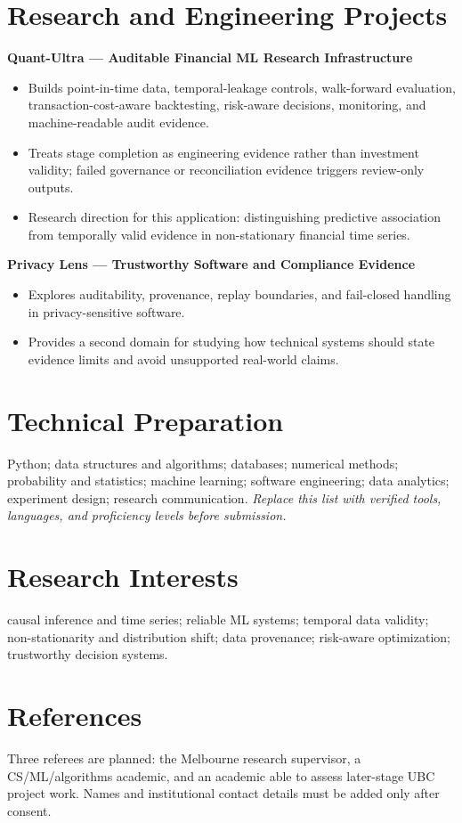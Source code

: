 \documentclass[11pt]{article}
\begin{document}
\section*{Research and Engineering Projects}
\textbf{Quant-Ultra --- Auditable Financial ML Research Infrastructure}
\begin{itemize}
\item Builds point-in-time data, temporal-leakage controls, walk-forward evaluation, transaction-cost-aware backtesting, risk-aware decisions, monitoring, and machine-readable audit evidence.
\item Treats stage completion as engineering evidence rather than investment validity; failed governance or reconciliation evidence triggers review-only outputs.
\item Research direction for this application: distinguishing predictive association from temporally valid evidence in non-stationary financial time series.
\end{itemize}

\begin{samepage}
\textbf{Privacy Lens --- Trustworthy Software and Compliance Evidence}
\begin{itemize}
\item Explores auditability, provenance, replay boundaries, and fail-closed handling in privacy-sensitive software.
\item Provides a second domain for studying how technical systems should state evidence limits and avoid unsupported real-world claims.
\end{itemize}
\end{samepage}

\section*{Technical Preparation}
Python; data structures and algorithms; databases; numerical methods; probability and statistics; machine learning; software engineering; data analytics; experiment design; research communication. \textit{Replace this list with verified tools, languages, and proficiency levels before submission.}

\section*{Research Interests}
causal inference and time series; reliable ML systems; temporal data validity; non-stationarity and distribution shift; data provenance; risk-aware optimization; trustworthy decision systems.

\section*{References}
Three referees are planned: the Melbourne research supervisor, a CS/ML/algorithms academic, and an academic able to assess later-stage UBC project work. Names and institutional contact details must be added only after consent.
\end{document}
